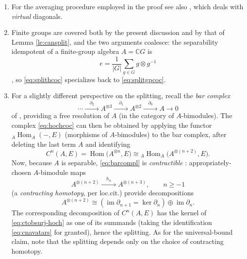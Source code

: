 \documentclass[pdftex]{sigma}
\numberwithin{equation}{section}
\newcommand\bC{{\mathbb C}}
\DeclareMathOperator{\Hom}{\mathrm{Hom}}
\DeclareMathOperator{\im}{\mathrm{im}}
\begin{document}
\begin{Remarks}\quad
 \begin{enumerate}[(1)]\itemsep=0pt
 \item For the averaging procedure employed in the proof see also \cite[Section~3]{cg-average}, which deals with {\it virtual} diagonals.


 \item Finite groups are covered both by the present discussion and by that of Lemma \ref{le:cansplit}, and the two arguments coalesce: the separability idempotent of a finite-group algebra $A=\bC G$ is
 \begin{equation*}
 e = \frac 1{|G|}\sum_{g\in G}g\otimes g^{-1}
 \end{equation*}
 \cite[Exercise 2.2.1]{run-lec}, so \eqref{eq:splithcoc} specializes back to \eqref{eq:splitgpcoc}.

 \item For a slightly different perspective on the splitting, recall the {\it bar complex}
 \begin{equation}\label{eq:barcompl}
 \cdots
 \xrightarrow{\quad \partial_2\quad}
 A^{\otimes 3}
 \xrightarrow{\quad \partial_1\quad}
 A^{\otimes 2}
 \xrightarrow{\quad \partial_0\quad}
 A\to 0
 \end{equation}
 of \cite[Definition 4.2.1]{ginz-ncg}, providing a free resolution of $A$ (in the category of $A$-bimodules). The complex \eqref{eq:hochcoc} can then be obtained by applying the functor ${}_A\Hom_{A}(-,E)$ (morphisms of $A$-bimodules) to the bar complex, after deleting the last term $A$ and identifying
 \begin{equation}\label{eq:cnavatars}
 C^n(A,E) = \Hom\big(A^{\otimes n},E\big)\cong {}_A\Hom_{A}\big(A^{\otimes (n+2)},E\big).
 \end{equation}
 Now, because $A$ is separable, \eqref{eq:barcompl} is {\it contractible} \cite[Definition following Theorem 6.14]{rot}: appropriately-chosen $A$-bimodule maps
 \begin{equation*}
 A^{\otimes(n+2)}\xrightarrow{\quad h_n\quad} A^{\otimes(n+3)},\qquad n\ge -1
 \end{equation*}
 (a {\it contracting homotopy}, per loc.cit.) provide decompositions
 \begin{equation*}
 A^{\otimes(n+2)} \cong \left(\im\partial_{n+1} = \ker\partial_n\right)\oplus \im\partial_n.
 \end{equation*}
 The corresponding decomposition of $C^n(A,E)$ has the kernel of \eqref{eq:ctobsurj-hoch} as one of its summands (taking the identification \eqref{eq:cnavatars} for granted), hence the splitting. As for the universal-bound claim, note that the splitting depends only on the choice of contracting homotopy.
 \end{enumerate}
\end{Remarks}
\end{document}
